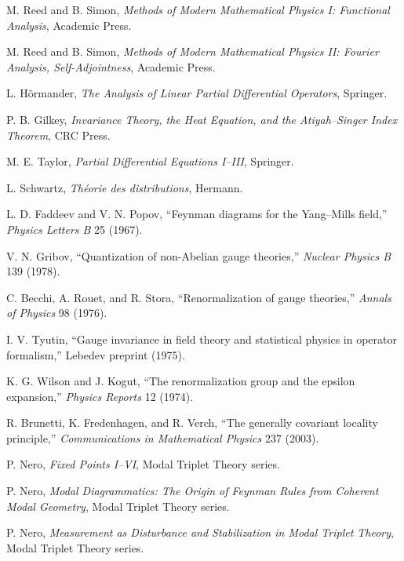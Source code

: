 \documentclass[11pt]{article}
\begin{document}
\begin{enumerate}[label={[\arabic*]}]
\item M. Reed and B. Simon, \emph{Methods of Modern Mathematical Physics I: Functional Analysis}, Academic Press.
\item M. Reed and B. Simon, \emph{Methods of Modern Mathematical Physics II: Fourier Analysis, Self-Adjointness}, Academic Press.
\item L. Hörmander, \emph{The Analysis of Linear Partial Differential Operators}, Springer.
\item P. B. Gilkey, \emph{Invariance Theory, the Heat Equation, and the Atiyah--Singer Index Theorem}, CRC Press.
\item M. E. Taylor, \emph{Partial Differential Equations I--III}, Springer.
\item L. Schwartz, \emph{Théorie des distributions}, Hermann.
\item L. D. Faddeev and V. N. Popov, ``Feynman diagrams for the Yang--Mills field,'' \emph{Physics Letters B} 25 (1967).
\item V. N. Gribov, ``Quantization of non-Abelian gauge theories,'' \emph{Nuclear Physics B} 139 (1978).
\item C. Becchi, A. Rouet, and R. Stora, ``Renormalization of gauge theories,'' \emph{Annals of Physics} 98 (1976).
\item I. V. Tyutin, ``Gauge invariance in field theory and statistical physics in operator formalism,'' Lebedev preprint (1975).
\item K. G. Wilson and J. Kogut, ``The renormalization group and the epsilon expansion,'' \emph{Physics Reports} 12 (1974).
\item R. Brunetti, K. Fredenhagen, and R. Verch, ``The generally covariant locality principle,'' \emph{Communications in Mathematical Physics} 237 (2003).
\item P. Nero, \emph{Fixed Points I--VI}, Modal Triplet Theory series.
\item P. Nero, \emph{Modal Diagrammatics: The Origin of Feynman Rules from Coherent Modal Geometry}, Modal Triplet Theory series.
\item P. Nero, \emph{Measurement as Disturbance and Stabilization in Modal Triplet Theory}, Modal Triplet Theory series.
\end{enumerate}
\end{document}

